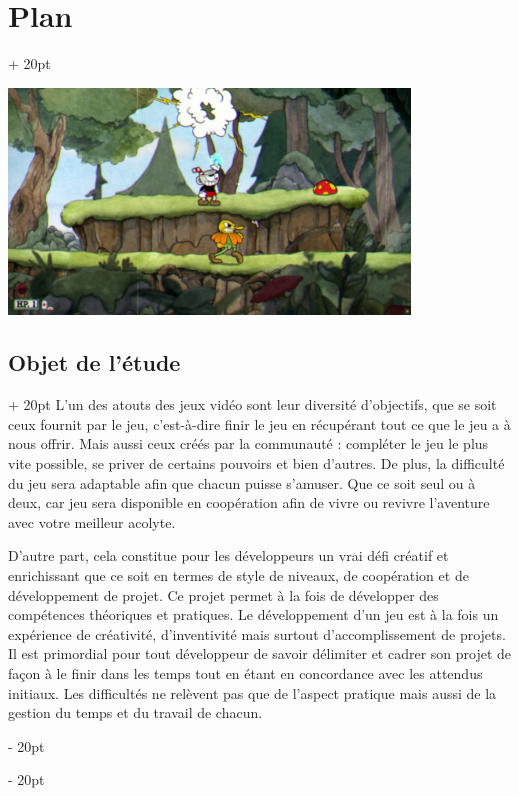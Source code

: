 \documentclass[a4paper, 12pt, twoside]{article}
\newcommand{\ind}[1][20pt]{\advance\leftskip + #1}
\newcommand{\deind}[1][20pt]{\advance\leftskip - #1}
\newenvironment{indt}[2][20pt]{#2 \par \ind[#1]}{\par \deind} %
\begin{document}
\begin{indt}{\section{Plan}}
        \begin{center}%
            \includegraphics[width=0.8\textwidth]{Cuphead.png}
        \end{center}

        \begin{indt}{\subsection{Objet de l'étude}}
            L'un des atouts des jeux vidéo sont leur diversité d'objectifs, que se soit ceux fournit par le jeu, c'est-à-dire finir le jeu en récupérant tout ce que le jeu a à nous offrir. Mais aussi ceux créés par la communauté : compléter le jeu le plus vite possible, se priver de certains pouvoirs et bien d'autres. De plus, la difficulté du jeu sera adaptable afin que chacun puisse s'amuser. Que ce soit seul ou à deux, car jeu sera disponible en coopération afin de vivre ou revivre l'aventure avec votre meilleur acolyte. 

            D'autre part, cela constitue pour les développeurs un vrai défi créatif et enrichissant que ce soit en termes de style de niveaux, de coopération et de développement de projet. Ce projet permet à la fois de développer des compétences théoriques et pratiques. Le développement d'un jeu est à la fois un expérience de créativité, d'inventivité mais surtout d'accomplissement de projets. Il est primordial pour tout développeur de savoir délimiter et cadrer son projet de façon à le finir dans les temps tout en étant en concordance avec les attendus initiaux. Les difficultés ne relèvent pas que de l'aspect pratique mais aussi de la gestion du temps et du travail de chacun.
        \end{indt}



\end{indt}
\end{document}
